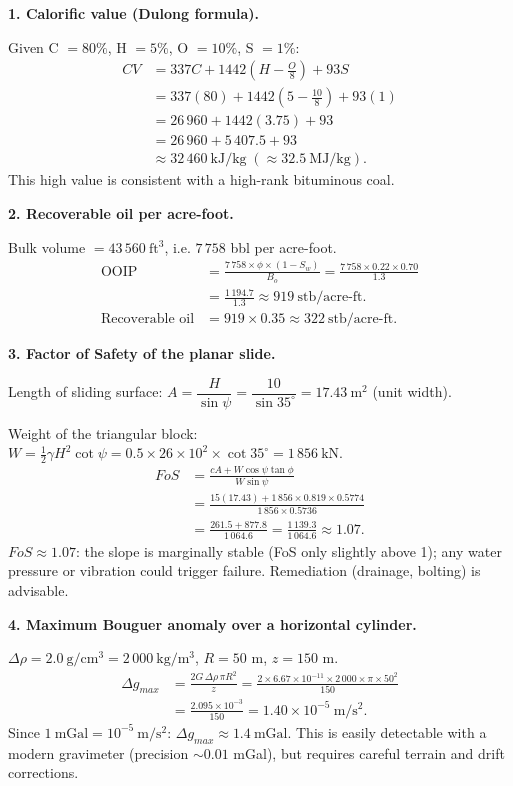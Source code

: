\documentclass[11pt]{article}
\begin{document}
\begin{corrige}
\textbf{1. Calorific value (Dulong formula).}\par
Given C $= 80\%$, H $= 5\%$, O $= 10\%$, S $= 1\%$:
\begin{align*}
CV &= 337C + 1442\left(H - \frac{O}{8}\right) + 93S\\
&= 337(80) + 1442\left(5 - \frac{10}{8}\right) + 93(1)\\
&= 26\,960 + 1442(3.75) + 93\\
&= 26\,960 + 5\,407.5 + 93\\
&\approx 32\,460\ \mathrm{kJ/kg} \;(\approx 32.5\ \mathrm{MJ/kg}).
\end{align*}
This high value is consistent with a high-rank bituminous coal.

\textbf{2. Recoverable oil per acre-foot.}\par
Bulk volume $= 43\,560\ \mathrm{ft^3}$, i.e. $7\,758$ bbl per acre-foot.
\begin{align*}
\text{OOIP} &= \frac{7\,758 \times \phi \times (1 - S_w)}{B_o}
= \frac{7\,758 \times 0.22 \times 0.70}{1.3}\\
&= \frac{1\,194.7}{1.3} \approx 919\ \mathrm{stb/acre\text{-}ft}.\\
\text{Recoverable oil} &= 919 \times 0.35 \approx 322\ \mathrm{stb/acre\text{-}ft}.
\end{align*}

\textbf{3. Factor of Safety of the planar slide.}\par
Length of sliding surface: $A = \dfrac{H}{\sin\psi} = \dfrac{10}{\sin 35^\circ} = 17.43\ \mathrm{m^2}$ (unit width).\par
Weight of the triangular block: $W = \tfrac{1}{2}\gamma H^2 \cot\psi = 0.5 \times 26 \times 10^2 \times \cot 35^\circ = 1\,856\ \mathrm{kN}$.
\begin{align*}
FoS &= \frac{cA + W\cos\psi\tan\phi}{W\sin\psi}\\
&= \frac{15(17.43) + 1\,856 \times 0.819 \times 0.5774}{1\,856 \times 0.5736}\\
&= \frac{261.5 + 877.8}{1\,064.6} = \frac{1\,139.3}{1\,064.6} \approx 1.07.
\end{align*}
$FoS \approx 1.07$: the slope is marginally stable (FoS only slightly above 1); any water pressure or vibration could trigger failure. Remediation (drainage, bolting) is advisable.

\textbf{4. Maximum Bouguer anomaly over a horizontal cylinder.}\par
$\Delta\rho = 2.0\ \mathrm{g/cm^3} = 2\,000\ \mathrm{kg/m^3}$, $R = 50$ m, $z = 150$ m.
\begin{align*}
\Delta g_{max} &= \frac{2G\,\Delta\rho\,\pi R^2}{z}
= \frac{2 \times 6.67\times10^{-11} \times 2\,000 \times \pi \times 50^2}{150}\\
&= \frac{2.095\times10^{-3}}{150} = 1.40\times10^{-5}\ \mathrm{m/s^2}.
\end{align*}
Since $1\ \mathrm{mGal} = 10^{-5}\ \mathrm{m/s^2}$: $\Delta g_{max} \approx 1.4\ \mathrm{mGal}$. This is easily detectable with a modern gravimeter (precision $\sim 0.01$ mGal), but requires careful terrain and drift corrections.
\end{corrige}
\end{document}
